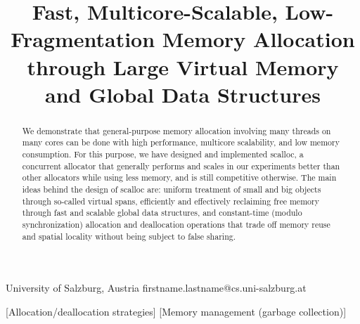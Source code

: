 \documentclass[10pt]{sigplanconf}
\begin{document}
\setlength{\pdfpageheight}{\paperheight}
\setlength{\pdfpagewidth}{\paperwidth}






\permissiontopublish             



\title{Fast, Multicore-Scalable, Low-Fragmentation Memory Allocation
through Large Virtual Memory and Global Data Structures}





           {University of Salzburg, Austria}
           {firstname.lastname@cs.uni-salzburg.at}

\maketitle

\begin{abstract}
We demonstrate that general-purpose memory allocation involving many threads on many cores can be done with high performance, multicore scalability, and low memory consumption.
For this purpose, we have designed and implemented scalloc, a concurrent allocator that generally performs and scales in our experiments better than
other allocators while using less memory, and is still competitive otherwise. The main ideas behind the design of scalloc are: uniform treatment of
small and big objects through so-called virtual spans, efficiently and
effectively reclaiming free memory through fast and scalable global data
structures, and constant-time (modulo synchronization) allocation and
deallocation operations that trade off memory reuse and spatial locality without being subject to false sharing.
\end{abstract}

[Allocation/deallocation strategies]
[Memory management (garbage collection)]



\end{document}
